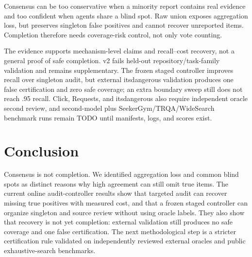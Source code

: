 \documentclass[letterpaper]{article}
\begin{document}
Consensus can be too conservative when a minority report contains real evidence
and too confident when agents share a blind spot. Raw union exposes aggregation
loss, but preserves singleton false positives and cannot recover unreported
items. Completion therefore needs coverage-risk control, not only vote counting.

The evidence supports mechanism-level claims and recall--cost recovery, not a
general proof of safe completion. v2 fails held-out repository/task-family
validation and remains supplementary. The frozen staged controller improves
recall over singleton audit, but external itsdangerous validation produces one
false certification and zero safe coverage; an extra boundary sweep still does
not reach .95 recall. Click, Requests, and itsdangerous also require independent
oracle second review, and second-model plus SeekerGym/TRQA/WideSearch benchmark
runs remain TODO until manifests, logs, and scores exist.

\section{Conclusion}

Consensus is not completion. We identified aggregation loss and common blind
spots as distinct reasons why high agreement can still omit true items. The
current online audit-controller results show that targeted audit can recover
missing true positives with measured cost, and that a frozen staged controller
can organize singleton and source review without using oracle labels. They also
show that recovery is not yet completion: external validation still produces no
safe coverage and one false certification. The next methodological step is a
stricter certification rule validated on independently reviewed external
oracles and public exhaustive-search benchmarks.


\end{document}
